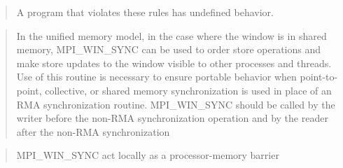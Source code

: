 \foreignblockcquote{english}[Kapitel 11.7, S. 456]{MPI-3.1}{%
    A program that violates these rules has undefined behavior.}


\foreignblockcquote{english}[Kapitel 11.7, S. 456]{MPI-3.1}{%
    In the unified memory model, in the case where the window is
    in shared memory, MPI\_WIN\_SYNC can be used to order store operations and make
    store updates to the window visible to other processes and threads. Use of this
    routine is necessary to ensure portable behavior when point-to-point, collective, or
    shared memory synchronization is used in place of an RMA synchronization routine.
    MPI\_WIN\_SYNC should be called by the writer before the non-RMA synchronization
    operation and by the reader after the non-RMA synchronization}

\foreignblockcquote{english}[Kapitel 11.7, S. 469]{MPI-3.1}{%
    MPI\_WIN\_SYNC \textelp{} act locally as a processor-memory barrier}
